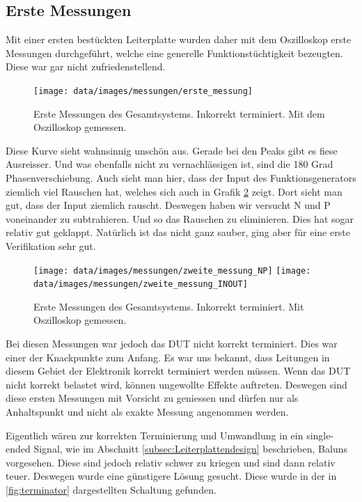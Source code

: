 \subsection{Erste Messungen}

Mit einer ersten bestückten Leiterplatte wurden daher mit dem Oszilloskop erste Messungen durchgeführt, welche eine generelle Funktionstüchtigkeit bezeugten. Diese war gar nicht zufriedenstellend.

\begin{figure}[H]
\begin{center}
    \texttt{[image: data/images/messungen/erste\_messung]}
    \caption{Erste Messungen des Gesamtsystems. Inkorrekt terminiert. Mit dem Oszilloskop gemessen.}
    \label{fig:messungen_erste}
\end{center}
\end{figure}

Diese Kurve sieht wahnsinnig unschön aus. Gerade bei den Peaks gibt es fiese Ausreisser. Und was ebenfalls nicht zu vernachlässigen ist, sind die 180 Grad Phasenverschiebung.
Auch sieht man hier, dass der Input des Funktionsgenerators ziemlich viel Rauschen hat, welches sich auch in Grafik \ref{fig:messungen_zweite} zeigt.
Dort sieht man gut, dass der Input ziemlich rauscht. Deswegen haben wir versucht N und P voneinander zu subtrahieren. Und so das Rauschen zu eliminieren. Dies hat sogar relativ gut geklappt. Natürlich ist das nicht ganz sauber, ging aber für eine erste Verifikation sehr gut.

\begin{figure}[H]
\begin{center}
    \texttt{[image: data/images/messungen/zweite\_messung\_NP]}
    \texttt{[image: data/images/messungen/zweite\_messung\_INOUT]}
    \caption{Erste Messungen des Gesamtsystems. Inkorrekt terminiert. Mit Oszilloskop gemessen.}
    \label{fig:messungen_zweite}
\end{center}
\end{figure}

Bei diesen Messungen war jedoch das DUT nicht korrekt terminiert. Dies war einer der Knackpunkte zum Anfang. Es war uns bekannt, dass Leitungen in diesem Gebiet der Elektronik korrekt terminiert werden müssen. Wenn das DUT nicht korrekt belastet wird, können ungewollte Effekte auftreten. Deswegen sind diese ersten Messungen mit Vorsicht zu geniessen und dürfen nur als Anhaltspunkt und nicht als exakte Messung angenommen werden.

Eigentlich wären zur korrekten Terminierung und Umwandlung in ein single-ended Signal, wie im Abschnitt \ref{subsec:Leiterplattendesign} beschrieben, Baluns vorgesehen. Diese sind jedoch relativ schwer zu kriegen und sind dann relativ teuer. Deswegen wurde eine günstigere Lösung gesucht. Diese wurde in der in \ref{fig:terminator} dargestellten Schaltung gefunden.

